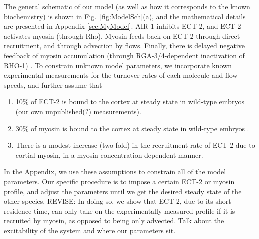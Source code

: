 \documentclass[11pt]{article}
\newcommand{\red}[1]{\color{red}#1\normalcolor}
\begin{document}
The general schematic of our model (as well as how it corresponds to the known biochemistry) is shown in Fig.\ \ref{fig:ModelSch}(a), and the mathematical details are presented in Appendix \ref{sec:MyModel}. AIR-1 inhibits ECT-2, and ECT-2 activates myosin (through Rho). Myosin feeds back on ECT-2 through direct recruitment, and through advection by flows. Finally, there is delayed negative feedback of myosin accumulation (through RGA-3/4-dependent inactivation of RHO-1) \citep{michaux2018excitable}. To constrain unknown model parameters, we incorporate known experimental measurements for the turnover rates of each molecule and flow speeds, and further assume that 
\begin{enumerate}
\item 10\% of ECT-2 is bound to the cortex at steady state in wild-type embryos (our own unpublished(?) measurements). 
\item 30\% of myosin is bound to the cortex at steady state in wild-type embryos \citep[Fig.~S3j]{gross2019guiding}.
\item There is a modest increase (two-fold) in the recruitment rate of ECT-2 due to cortial myosin, in a myosin concentration-dependent manner.
\end{enumerate}
In the Appendix, we use these assumptions to constrain all of the model parameters. Our specific procedure is to impose a certain ECT-2 or myosin profile, and adjust the parameters until we get the desired steady state of the other species. \red{REVISE: In doing so, we show that ECT-2, due to its short residence time, can only take on the experimentally-measured profile if it is recruited by myosin, as opposed to being only advected. Talk about the excitability of the system and where our parameters sit.}
\end{document}
